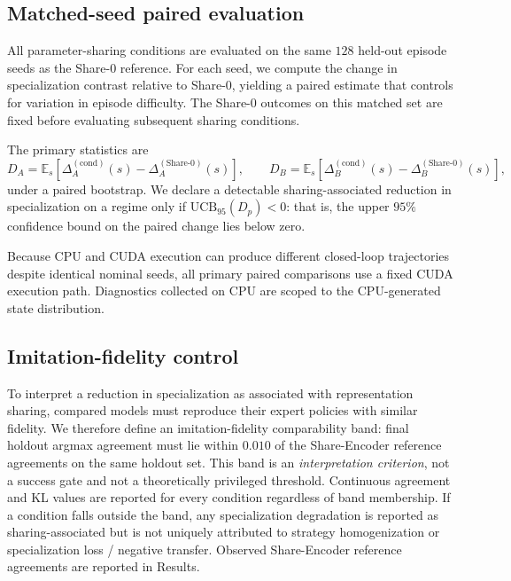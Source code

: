 \subsection{Matched-seed paired evaluation}
\label{sec:matched}

All parameter-sharing conditions are evaluated on the same $128$ held-out
episode seeds as the Share-0 reference. For each seed, we compute the change in
specialization contrast relative to Share-0, yielding a paired estimate that
controls for variation in episode difficulty. The Share-0 outcomes on this
matched set are fixed before evaluating subsequent sharing conditions.

The primary statistics are
\[
D_A=\mathbb{E}_s\!\left[\Delta_A^{\mathrm{(cond)}}(s)-\Delta_A^{\mathrm{(Share\textrm{-}0)}}(s)\right],
\qquad
D_B=\mathbb{E}_s\!\left[\Delta_B^{\mathrm{(cond)}}(s)-\Delta_B^{\mathrm{(Share\textrm{-}0)}}(s)\right],
\]
under a paired bootstrap. We declare a detectable sharing-associated reduction
in specialization on a regime only if $\mathrm{UCB}_{95}(D_p)<0$: that is, the
upper $95\%$ confidence bound on the paired change lies below zero.

Because CPU and CUDA execution can produce different closed-loop trajectories
despite identical nominal seeds, all primary paired comparisons use a fixed CUDA
execution path. Diagnostics collected on CPU are scoped to the CPU-generated
state distribution.

\subsection{Imitation-fidelity control}
\label{sec:fidelity}

To interpret a reduction in specialization as associated with representation
sharing, compared models must reproduce their expert policies with similar
fidelity. We therefore define an imitation-fidelity comparability band:
final holdout argmax agreement must lie within $0.010$ of the Share-Encoder
reference agreements on the same holdout set. This band is an
\emph{interpretation criterion}, not a success gate and not a theoretically
privileged threshold. Continuous agreement and KL values are reported for every
condition regardless of band membership. If a condition falls outside the band,
any specialization degradation is reported as sharing-associated but is not
uniquely attributed to strategy homogenization or specialization loss /
negative transfer. Observed Share-Encoder reference agreements are reported in
Results.

